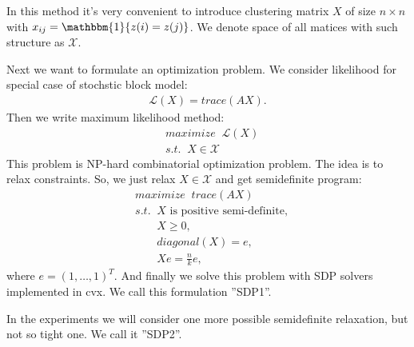 
In this method it's very convenient to introduce clustering matrix $X$ of size $n\times n$ with $x_{ij} = \mathbbm{1}\{ z(i) = z(j) \}$.
We denote space of all matices with such structure as $\mathcal{X}$.
                
Next we want to formulate an optimization problem.
We consider likelihood for special case of stochstic block model:
\begin{equation}
    \begin{aligned}
        \mathcal{L}(X) = trace(AX).
    \nonumber
    \end{aligned}
\end{equation}
Then we write maximum likelihood method:
\begin{equation}
    \begin{aligned}
    &maximize\;\;\mathcal{L}(X)\\
    &s.t. \;\;X \in \mathcal{X}
    \nonumber
    \end{aligned}
\end{equation}
This problem is NP-hard combinatorial optimization problem. The idea is to relax constraints.
So, we just relax $X \in \mathcal{X}$ and get semidefinite program:
\begin{equation}
    \begin{aligned}
    &maximize\;\;trace(AX)\\
    &s.t. \;\;X \text{ is positive semi-definite}, \\
    &\;\;\;\;\;\;\; X \geq 0, \\
    &\;\;\;\;\;\;\; diagonal(X) = e, \\
    &\;\;\;\;\;\;\; Xe = \frac{n}{k}e,
    \nonumber
    \end{aligned}
\end{equation}
where $e = (1,\ldots,1)^T$.
And finally we solve this problem with SDP solvers implemented in cvx. We call this formulation ''SDP1''.

In the experiments we will consider one more possible semidefinite relaxation, but not so tight one. We call it ''SDP2''.

\begin{equation}
    \begin{aligned}
    \nonumber
    \end{aligned}
\end{equation}
